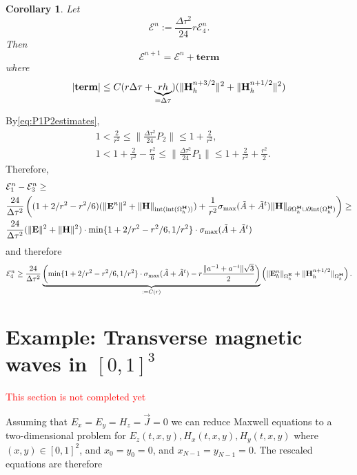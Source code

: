\documentclass[12pt,reqno]{amsart}
\newcommand{\e}{{\bf E}}
\newcommand{\h}{{\bf H}}
\newtheorem{cor}[theorem]{Corollary}
\theoremstyle{definition}
\numberwithin{equation}{section}
\newcommand{\intr}[1]{\mathrm{int}(#1)}
\def\Gwh{\Omega_h}
\begin{document}
\begin{cor}
	Let 
	$$
	\mathcal{E}^n:=\frac{\Delta \tau^2}{24}r\mathcal{E}_4^n.
	$$
	Then 
	$$
	\mathcal{E}^{n+1}=	\mathcal{E}^n+\mathbf{term}
	$$
	where 
	$$
	|\mathbf{term}|\leq C(r\Delta \tau  +\underbrace{rh}_{=\Delta \tau})(\| \h_h^{n+3/2}\|^2+\|\h_h^{n+1/2}\|^2)
	$$
\end{cor}
By\eqref{eq:P1P2estimates}, 
\begin{align}
	&
	1<\frac{2}{r^2}\leq \|\frac{\Delta \tau^2}{24}P_2\|\leq 1+\frac{2}{r^2},\\&
	1<1+\frac{2}{r^2}-\frac{r^2}{6}\leq\|\frac{\Delta \tau^2}{24}P_1\|\leq 1+\frac{2}{r^2}+\frac{r^2}{2}.
\end{align} 
Therefore,
\begin{align*}
	&
	\mathcal{E}_1^n-\mathcal{E}_3^n\geq\\&
	\frac{24}{\Delta \tau^2}\left ((1+2/r^2-r^2/6)(\|\e^n\|^2
	+\|\h\|_{\intr{\intr{\Gwh^\h}}})+\frac{1}{r^2}\sigma_{\max}(\tilde{A}+\tilde{A}^t)
	\|\h\|_{\partial{\Gwh^\h}\cup \partial \intr{\Gwh^\h}}
	\right)\geq \\&
		\frac{24}{\Delta \tau^2}(\|\e\|^2+\|\h\|^2)\cdot 
		\min\{1+2/r^2-r^2/6,1/r^2\}\cdot\sigma_{\max}(\tilde{A}+\tilde{A}^t)
\end{align*}
and therefore
$$
\mathcal{E}_4^n\geq 
\frac{24}{\Delta \tau^2}
\underbrace{
 \left(
	\min\{1+2/r^2-r^2/6,1/r^2\}\cdot\sigma_{\max}(\tilde{A}+\tilde{A}^t)-r\frac{\|a^{-1}+a^{-t}\|\sqrt{3}}{2}
\right)}_{:=C(r)}
\left ( \|\e_h^n\|_{\Gwh^\e}+\|\h_h^{n+1/2}\|_{\Gwh^\h}\right).
$$










 

	

	\newpage
	\section{Example: Transverse magnetic waves  in $[0,1]^3$}\label{sec:TE}
	\textcolor{red}{This section is not completed yet}
	
	Assuming that $E_x=E_y=H_z=\vec{J}=0$ we can reduce Maxwell equations to a two-dimensional problem for $E_z(t,x,y), H_x(t,x,y), H_y(t,x,y)$ where  $(x,y)\in[0,1]^2$, and
	$x_0=y_0=0$, and $x_{N-1}=y_{N-1}=0$.
	The rescaled equations are therefore 
	
\end{document}
